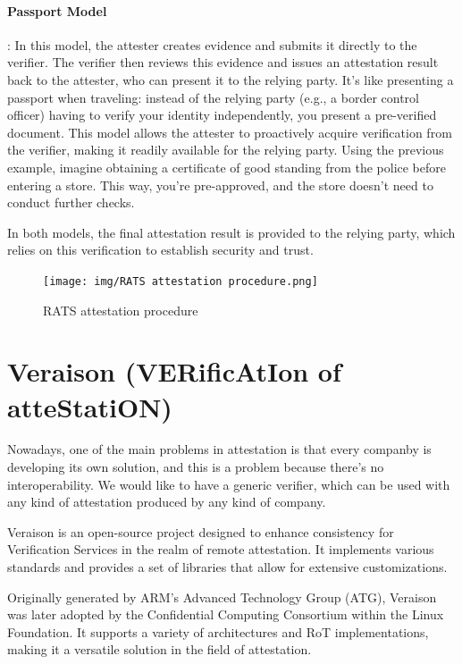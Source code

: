 \paragraph{Passport Model}: In this model, the attester creates
evidence and submits it directly to the verifier. The verifier then
reviews this evidence and issues an attestation result back to the
attester, who can present it to the relying party. It’s like
presenting a passport when traveling: instead of the relying party
(e.g., a border control officer) having to verify your identity
independently, you present a pre-verified document. This model allows
the attester to proactively acquire verification from the verifier,
making it readily available for the relying party. Using the previous
example, imagine obtaining a certificate of good standing from the
police before entering a store. This way, you’re pre-approved, and the
store doesn’t need to conduct further checks.

In both models, the final attestation result is provided to the
relying party, which relies on this verification to establish security
and trust.


\begin{figure}[H]
  \centering
  \texttt{[image: img/RATS attestation
  procedure.png]}
  \caption{RATS attestation procedure}
\end{figure}

\section{Veraison (VERificAtIon of atteStatiON)}

Nowadays, one of the main problems in attestation is that every
companby is developing its own solution, and this is a problem because
there's no interoperability. We would like to have a generic verifier,
which can be used with any kind of attestation produced by any kind of
company.

Veraison is an open-source project designed to enhance consistency for
Verification Services in the realm of remote attestation. It
implements various standards and provides a set of libraries that
allow for extensive customizations.

Originally generated by ARM's Advanced Technology Group (ATG),
Veraison was later adopted by the Confidential Computing Consortium
within the Linux Foundation. It supports a variety of architectures
and RoT implementations, making it a versatile
solution in the field of attestation.

